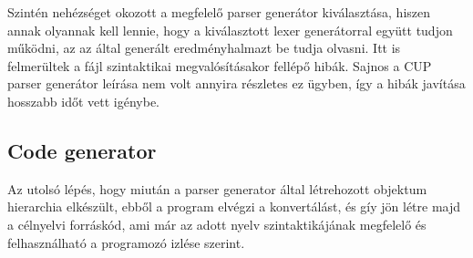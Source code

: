 Szintén nehézséget okozott a megfelelő parser generátor kiválasztása, hiszen annak olyannak kell lennie, hogy a kiválasztott lexer generátorral együtt tudjon működni, az az által generált eredményhalmazt be tudja olvasni. Itt is felmerültek a fájl szintaktikai megvalósításakor fellépő hibák. Sajnos a CUP parser generátor leírása nem volt annyira részletes ez ügyben, így a hibák javítása hosszabb időt vett igénybe.

\subsection{Code generator}

Az utolsó lépés, hogy miután a parser generator által létrehozott objektum hierarchia elkészült, ebből a program elvégzi a konvertálást, és gíy jön létre majd a célnyelvi forráskód, ami már az adott nyelv szintaktikájának megfelelő és felhasználható a programozó izlése szerint.
